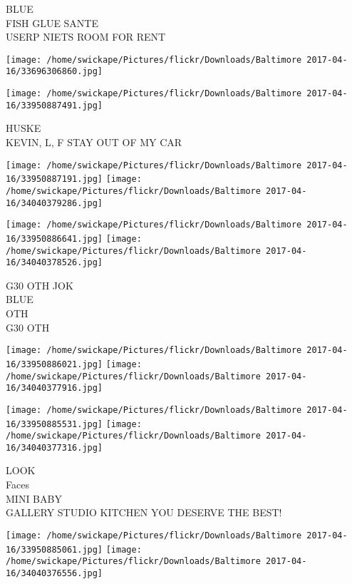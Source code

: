 \documentclass[10pt,letterpaper]{article}
\begin{document}
BLUE\\
FISH GLUE SANTE\\
USERP NIETS ROOM FOR RENT\\
\pagebreak

\texttt{[image: /home/swickape/Pictures/flickr/Downloads/Baltimore 2017-04-16/33696306860.jpg]}

\vspace{0.25in}
\texttt{[image: /home/swickape/Pictures/flickr/Downloads/Baltimore 2017-04-16/33950887491.jpg]}

HUSKE\\
KEVIN, L, F STAY OUT OF MY CAR\\
\pagebreak

\texttt{[image: /home/swickape/Pictures/flickr/Downloads/Baltimore 2017-04-16/33950887191.jpg]}
\texttt{[image: /home/swickape/Pictures/flickr/Downloads/Baltimore 2017-04-16/34040379286.jpg]}

\texttt{[image: /home/swickape/Pictures/flickr/Downloads/Baltimore 2017-04-16/33950886641.jpg]}
\texttt{[image: /home/swickape/Pictures/flickr/Downloads/Baltimore 2017-04-16/34040378526.jpg]}

G30 OTH JOK\\
BLUE\\
OTH\\
G30 OTH\\
\pagebreak

\texttt{[image: /home/swickape/Pictures/flickr/Downloads/Baltimore 2017-04-16/33950886021.jpg]}
\texttt{[image: /home/swickape/Pictures/flickr/Downloads/Baltimore 2017-04-16/34040377916.jpg]}

\texttt{[image: /home/swickape/Pictures/flickr/Downloads/Baltimore 2017-04-16/33950885531.jpg]}
\texttt{[image: /home/swickape/Pictures/flickr/Downloads/Baltimore 2017-04-16/34040377316.jpg]}

LOOK\\
Faces\\
MINI BABY\\
GALLERY STUDIO KITCHEN YOU DESERVE THE BEST!\\
\pagebreak

\texttt{[image: /home/swickape/Pictures/flickr/Downloads/Baltimore 2017-04-16/33950885061.jpg]}
\texttt{[image: /home/swickape/Pictures/flickr/Downloads/Baltimore 2017-04-16/34040376556.jpg]}
\end{document}
